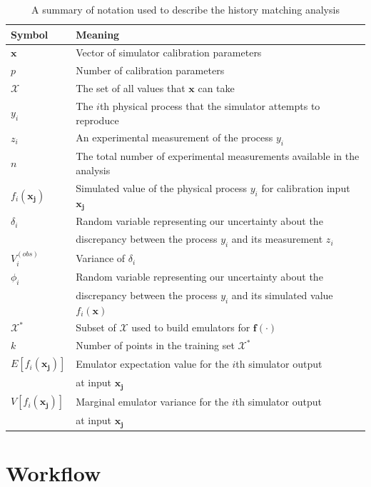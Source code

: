 \documentclass[
  12pt,
  a4paper,
  twoside]{book}
\begin{document}
\begin{table}\centering
\caption{A summary of notation used to describe the history matching analysis}
\label{tab:notation}
\begin{tabular}{|l|l|}
\hline
\textbf{Symbol}&\textbf{Meaning}\\
\hline
$\mathbf{x}$& Vector of simulator calibration parameters\\
\hline
$p$& Number of calibration parameters \\
\hline
$\mathcal{X}$&The set of all values that $\mathbf{x}$ can take \\
\hline
$y_i$& The $i$th physical process that the simulator attempts to reproduce\\
\hline
$z_i$& An experimental measurement of the process $y_i$\\
\hline
$n$& The total number of experimental measurements available in the analysis\\
\hline
$f_i(\mathbf{x_j})$& Simulated value of the physical process $y_i$ for calibration input $\mathbf{x_j}$\\
\hline
$\delta_i$& Random variable representing our uncertainty about the\\ 
&discrepancy between the process $y_i$ and its measurement $z_i$\\
\hline
$V_i^{(obs)}$& Variance of $\delta_i$\\
\hline
$\phi_i$&Random variable representing our uncertainty about the\\
&discrepancy between the process $y_i$ and its simulated value $f_i(\mathbf{x})$\\
\hline
$\mathcal{X^*}$& Subset of $\mathcal{X}$ used to build emulators for $\mathbf{f}(\cdot)$\\
\hline
$k$& Number of points in the training set $\mathcal{X^*}$\\
\hline
$E[f_i(\mathbf{x_j})]$& Emulator expectation value for the $i$th simulator output\\ 
& at input $\mathbf{x_j}$\\
\hline
$V[f_i(\mathbf{x_j})]$& Marginal emulator variance for the $i$th simulator output\\ 
& at input $\mathbf{x_j}$\\
\hline
\end{tabular}
\end{table}

\hypertarget{workflow}{%
\section{Workflow}\label{workflow}}
\end{document}
